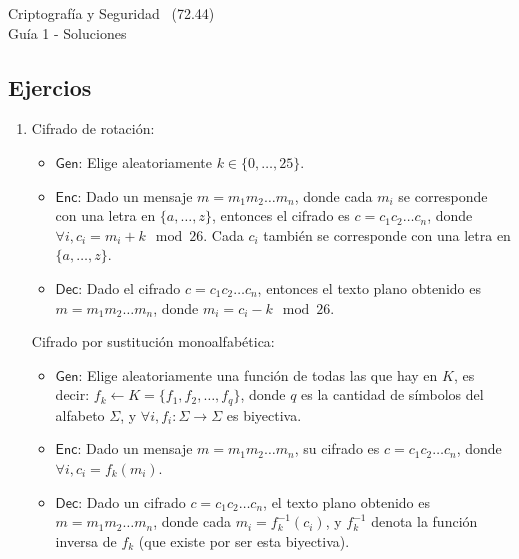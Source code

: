 \documentclass[]{book}
\theoremstyle{definition}
\begin{document}
\begin{center}
  {\Large Criptografía y Seguridad \the\year~(72.44)\\[.2cm]
Guía 1 - Soluciones}\\
\end{center}

\vspace{0.2 cm}


\subsection*{Ejercios}
\begin{enumerate}
\item Cifrado de rotación:
\begin{itemize}
\item $\mathsf{Gen}$: Elige aleatoriamente $k \in \{0,\dots,25\}$.
\item $\mathsf{Enc}$: Dado un mensaje $m = m_1m_2\dots m_n$, donde cada $m_i$ se
  corresponde con una letra en $\{a,\dots,z\}$, entonces el cifrado es $c =
  c_1c_2\dots c_n$, donde $\forall i, c_i = m_i + k \mod 26$. Cada $c_i$
  también se corresponde con una letra en $\{a,\dots,z\}$.
\item $\mathsf{Dec}$: Dado el cifrado $c = c_1c_2\dots c_n$, entonces el texto plano
  obtenido es $m = m_1m_2\dots m_n$, donde $m_i = c_i - k \mod 26$.
\end{itemize}

Cifrado por sustitución monoalfabética:
\begin{itemize}
\item $\mathsf{Gen}$: Elige aleatoriamente una función de todas las que hay en
  $K$, es decir: $f_k \leftarrow K = \{f_1, f_2, \dots , f_q\}$, donde $q$ es la cantidad de símbolos del alfabeto $\Sigma$, y $\forall i, f_i : \Sigma \longrightarrow \Sigma$ es biyectiva.
\item $\mathsf{Enc}$: Dado un mensaje $m = m_1m_2\dots m_n$, su cifrado es $c = c_1c_2\dots c_n$, donde $\forall i, c_i = f_k(m_i)$.
\item $\mathsf{Dec}$: Dado un cifrado $c = c_1c_2\dots c_n$, el texto plano
  obtenido es $m = m_1m_2\dots m_n$, donde cada $m_i = f^{-1}_k(c_i)$, y $f^{-1}_k$ denota la función inversa de $f_k$ (que existe por ser esta biyectiva).
\end{itemize}


\end{enumerate}
\end{document}
